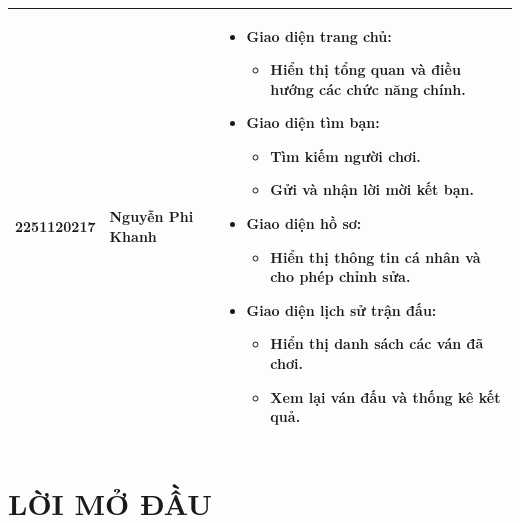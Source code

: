 \documentclass[a4paper,12pt]{article}
\begin{document}
\begin{center}
\begin{tabular}{| C{2cm} | C{3cm} | m{8cm} |}
  2251120217
  & Nguyễn Phi Khanh
  &
  \begin{itemize}[leftmargin=*,itemsep=0pt,parsep=0pt]
    \item \textbf{Giao diện trang chủ:}
      \begin{itemize}[leftmargin=1em,itemsep=0pt]
        \item Hiển thị tổng quan và điều hướng các chức năng chính.
      \end{itemize}
    \item \textbf{Giao diện tìm bạn:}
      \begin{itemize}[leftmargin=1em,itemsep=0pt]
        \item Tìm kiếm người chơi.
        \item Gửi và nhận lời mời kết bạn.
      \end{itemize}
    \item \textbf{Giao diện hồ sơ:}
      \begin{itemize}[leftmargin=1em,itemsep=0pt]
        \item Hiển thị thông tin cá nhân và cho phép chỉnh sửa.
      \end{itemize}
    \item \textbf{Giao diện lịch sử trận đấu:}
      \begin{itemize}[leftmargin=1em,itemsep=0pt]
        \item Hiển thị danh sách các ván đã chơi.
        \item Xem lại ván đấu và thống kê kết quả.
      \end{itemize}
  \end{itemize}
  \\
  \hline
\end{tabular}
\end{center}

\restoregeometry


\newpage
\thispagestyle{empty} %

\tableofcontents
\thispagestyle{empty}

\newpage %


\section*{\centering LỜI MỞ ĐẦU} %
\end{document}
